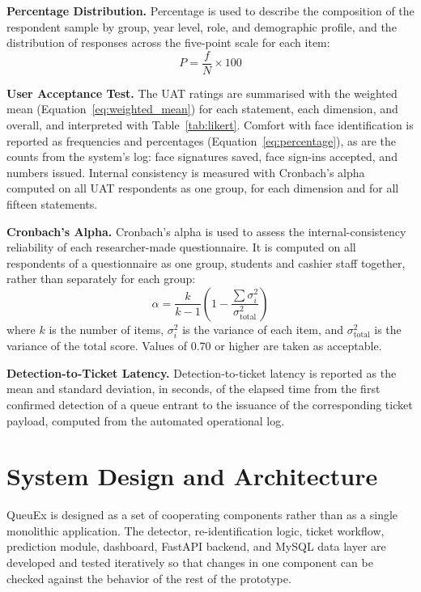 \documentclass{research}
\newcommand{\sysname}{QueuEx}
\begin{document}
\textbf{Percentage Distribution.} Percentage is used to describe the
composition of the respondent sample by group, year level, role, and
demographic profile, and the distribution of responses across the
five-point scale for each item:
\begin{equation}
  P = \frac{f}{N} \times 100
  \label{eq:percentage}
\end{equation}

\textbf{User Acceptance Test.} The UAT ratings are summarised with the
weighted mean (Equation~\ref{eq:weighted_mean}) for each statement, each
dimension, and overall, and interpreted with Table~\ref{tab:likert}.
Comfort with face identification is reported as frequencies and
percentages (Equation~\ref{eq:percentage}), as are the counts from the
system's log: face signatures saved, face sign-ins accepted, and numbers
issued. Internal consistency is measured with Cronbach's alpha
computed on all UAT respondents as one group, for each dimension and for
all fifteen statements.

\textbf{Cronbach's Alpha.} Cronbach's alpha is used to assess the
internal-consistency reliability of each researcher-made questionnaire.
It is computed on all respondents of a questionnaire as one group,
students and cashier staff together, rather than separately for each
group:
\begin{equation}
  \alpha =
  \frac{k}{k - 1}
  \left(1 - \frac{\sum\sigma_i^2}{\sigma_{\text{total}}^2}\right)
  \label{eq:cronbach_alpha}
\end{equation}
where $k$ is the number of items, $\sigma_i^2$ is the variance of each
item, and $\sigma_{\text{total}}^2$ is the variance of the total score.
Values of 0.70 or higher are taken as acceptable.

\textbf{Detection-to-Ticket Latency.} Detection-to-ticket latency is
reported as the mean and standard deviation, in seconds, of the elapsed
time from the first confirmed detection of a queue entrant to the
issuance of the corresponding ticket payload, computed from the
automated operational log.

\section{System Design and Architecture}
\label{sec:design-arch}

\sysname{} is designed as a set of cooperating components rather than as
a single monolithic application. The detector, re-identification logic,
ticket workflow, prediction module, dashboard, FastAPI backend, and
MySQL data layer are developed and tested iteratively so that changes
in one component can be checked against the behavior of the rest of the
prototype.
\end{document}
